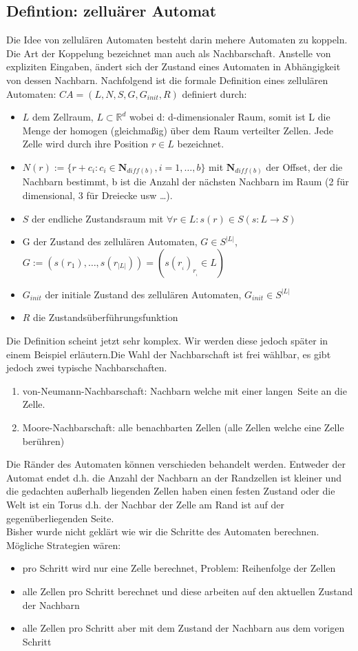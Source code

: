 \documentclass[11pt, fleqn, a4paper, leqno]{scrartcl} %
\begin{document}
	\subsection{Defintion: zelluärer Automat}
		Die Idee von zellulären Automaten besteht darin mehere Automaten zu koppeln. Die Art der Koppelung bezeichnet man auch als Nachbarschaft. Anstelle von expliziten Eingaben, ändert sich der Zustand eines Automaten in Abhängigkeit von dessen Nachbarn. Nachfolgend ist die formale Definition eines zellulären Automaten: $CA=(L,N,S,G,G_{init},R)$ definiert durch:
		\begin{itemize}
			\item $L$ dem Zellraum, $L \subset \mathds{R}^{d}$ wobei d: d-dimensionaler Raum, somit ist L die Menge der homogen (gleichmaßig) über dem Raum verteilter Zellen. Jede Zelle wird durch ihre Position $r\in L$ bezeichnet.
			\item $N(r) := \{r+c_{i}:c_{i} \in \mathbf{N}_{diff(b)}, i = 1,\dots,b\}$ mit $\mathbf{N}_{diff(b)}$ der Offset, der die Nachbarn bestimmt, b ist die Anzahl der nächsten Nachbarn im Raum (2 für dimensional, 3 für Dreiecke usw \dots).
			\item $S$ der endliche Zustandsraum  mit $\forall r \in L : s(r) \in S (s : L \rightarrow S)$
			\item G der Zustand des zellulären Automaten, $G \in S^{|L|}$,$G := (s(r_{1}),\dots,s(r_{|L|})) = (s(r_{_{i}})_{r_{_{i}}} \in L)$
			\item $G_{init}$ der initiale Zustand des zellulären Automaten, $G_{init} \in S^{|L|}$
			\item $R$ die Zustandsüberführungsfunktion
		\end{itemize}
		Die Definition scheint jetzt sehr komplex. Wir werden diese jedoch später in einem Beispiel erläutern.Die Wahl der Nachbarschaft ist frei wählbar, es gibt jedoch zwei typische Nachbarschaften.\\
		\begin{enumerate}
		\item von-Neumann-Nachbarschaft: Nachbarn welche mit einer \glqq langen\grqq\ Seite an die Zelle.
		\item Moore-Nachbarschaft: alle benachbarten Zellen (alle Zellen welche eine Zelle berühren)
		\end{enumerate}
		Die Ränder des Automaten können verschieden behandelt werden. Entweder der Automat endet d.h. die Anzahl der Nachbarn an der Randzellen ist kleiner und die gedachten außerhalb liegenden Zellen haben einen festen Zustand oder die Welt ist ein Torus d.h. der Nachbar der Zelle am Rand ist auf der gegenüberliegenden Seite.\\
		Bisher wurde nicht geklärt wie wir die Schritte des Automaten berechnen. Mögliche Strategien wären:
		\begin{itemize}
			\item pro Schritt wird nur eine Zelle berechnet, Problem: Reihenfolge der Zellen
			\item alle Zellen pro Schritt berechnet und diese arbeiten auf den aktuellen Zustand der Nachbarn
			\item alle Zellen pro Schritt aber mit dem Zustand der Nachbarn aus dem vorigen Schritt
		\end{itemize}
\end{document}
